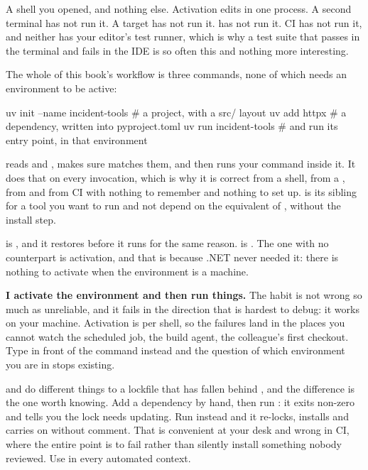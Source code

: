 A shell you opened, and nothing else. Activation edits  in one
process. A second terminal has not run it. A  target has not run
it.  has not run it. CI has not run it, and neither has your
editor's test runner, which is why a test suite that passes in the terminal and
fails in the IDE is so often this and nothing more interesting.

The whole of this book's workflow is three commands, none of which needs an
environment to be active:

\begin{shellcmd}
uv init --name incident-tools  # a project, with a src/ layout
uv add httpx                   # a dependency, written into pyproject.toml
uv run incident-tools          # and run its entry point, in that environment
\end{shellcmd}

\noindent
{} reads  and , makes sure
 matches them, and then runs your command inside it. It does that
on every invocation, which is why it is correct from a shell, from a
, from  and from CI with nothing to remember and
nothing to set up.  is its sibling for a tool you want to run and
not depend on \dash{} the equivalent of , without the
install step.

\begin{csbox}
 is , and it restores before it runs for the
same reason.  is . The one with no
counterpart is activation, and that is because .NET never needed it: there is
nothing to activate when the environment is a machine.
\end{csbox}

\begin{trapbox}
\textbf{I activate the environment and then run things.} The habit is not
wrong so much as unreliable, and it fails in the direction that is hardest to
debug: it works on your machine. Activation is per shell, so the failures land
in the places you cannot watch \dash{} the scheduled job, the build agent, the
colleague's first checkout. Type  in front of the command instead
and the question of which environment you are in stops existing.
\end{trapbox}

\begin{warning}
 and  do different things to a lockfile
that has fallen behind , and the difference is the one
worth knowing. Add a dependency by hand, then run : it
exits non-zero and tells you the lock needs updating. Run 
instead and it re-locks, installs and carries on without comment. That is
convenient at your desk and wrong in CI, where the entire point is to fail
rather than silently install something nobody reviewed. Use
 in every automated context.
\end{warning}

